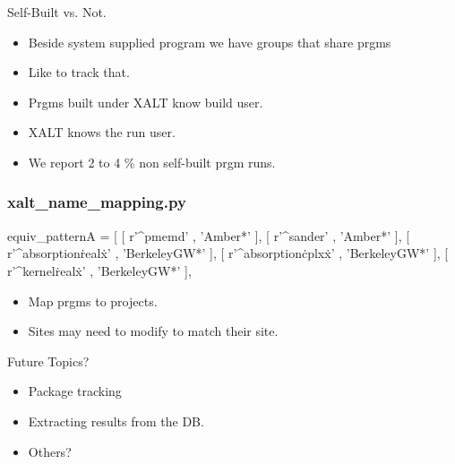 \documentclass{beamer}
\begin{document}
\begin{frame}{Self-Built vs. Not.}
  \begin{itemize}
    \item Beside system supplied program we have groups that share prgms
    \item Like to track that.
    \item Prgms built under XALT know build user.
    \item XALT knows the run user.
    \item We report 2 to 4 \% non self-built prgm runs.
  \end{itemize}
\end{frame}

\begin{frame}[fragile]
    \frametitle{xalt\_name\_mapping.py}
 {\tiny
    \begin{semiverbatim}
equiv_patternA = [
    [ r'^pmemd'               , 'Amber*'      ],
    [ r'^sander'              , 'Amber*'      ],
    [ r'^absorption\.real\.x' , 'BerkeleyGW*' ],
    [ r'^absorption\.cplx\.x' , 'BerkeleyGW*' ],
    [ r'^kernel\.real\.x'     , 'BerkeleyGW*' ],
    \end{semiverbatim}
  \begin{itemize}
    \item Map prgms to projects.
    \item Sites may need to modify to match their site.
  \end{itemize}
}
\end{frame}


\begin{frame}{Future Topics?} 
  \begin{itemize}
    \item Package tracking
    \item Extracting results from the DB.
    \item Others?
  \end{itemize}
\end{frame}
%

%
\end{document}

